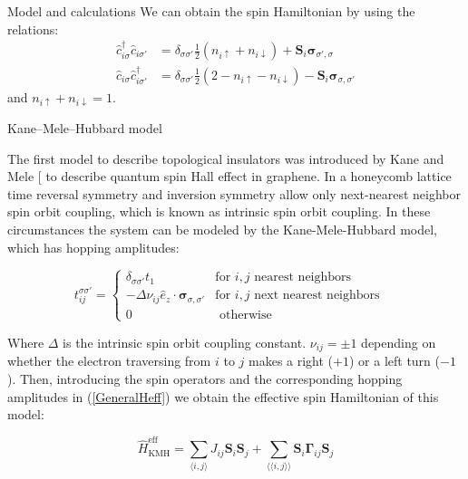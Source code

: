 \documentclass[aps,prl,twocolumn,amsmath,amssymb,superscriptaddress,nobibnotes]{revtex4}%
\renewcommand{\cite}[1]{{[}\onlinecite{#1}{]}}
\newcommand{\n}{\nonumber}
\newcommand{\bs}{\boldsymbol}
\begin{document}
\begin{section}{Model and calculations}
We can obtain the spin Hamiltonian by using the relations:
\begin{align}
\hat{c}_{i \sigma}^\dagger \hat{c}_{i \sigma'} &= \delta_{\sigma \sigma'} \frac{1}{2} (n_{i \uparrow} + n_{i \downarrow}) + \boldsymbol{S}_i\boldsymbol{\sigma}_{\sigma', \sigma} \label{SpinOperatorInv1}\\ 
\hat{c}_{i \sigma} \hat{c}_{i \sigma'}^\dagger &= \delta_{\sigma \sigma'} \frac{1}{2} (2 - n_{i \uparrow} - n_{i \downarrow}) - \boldsymbol{S}_i\boldsymbol{\sigma}_{\sigma, \sigma'} \label{SpinOperatorInv2}
\end{align}
and $n_{i \uparrow} + n_{i \downarrow} = 1$.

\begin{subsection}{Kane--Mele--Hubbard model}

The first model to describe topological insulators was introduced by Kane and Mele \cite{Kane2005} to describe quantum spin Hall effect in graphene. In a honeycomb lattice time reversal symmetry and inversion symmetry allow only next-nearest neighbor spin orbit coupling, which is known as intrinsic spin orbit coupling. In these circumstances the system can be modeled by the Kane-Mele-Hubbard model, which has hopping amplitudes:

\begin{equation}
t_{ij}^{\sigma \sigma'} = \begin{cases}
	\delta_{\sigma \sigma'}t_1 & \text{for } i, j \text{ nearest neighbors} \\
	-\Delta \nu_{ij} \hat{e}_z \cdot \bs{\sigma}_{\sigma, \sigma'} & \text{for } i, j \text{ next nearest neighbors} \\
	0 & \text{ otherwise} \n
\end{cases} \quad
\end{equation}

Where $\Delta$ is the intrinsic spin orbit coupling constant. $\nu_{ij}=\pm 1$ depending on whether the electron traversing from $i$ to $j$ makes a right ($+1$) or a left turn ($-1$). Then, introducing the spin operators and the corresponding hopping amplitudes in (\ref{GeneralHeff}) we obtain the effective spin Hamiltonian of this model:

\begin{equation}
\label{KMHeff}
\hat{H}_{\text{KMH}}^{\text{eff}} = \sum_{\langle i,j \rangle} J_{ij} \bs{S}_i \bs{S}_j + \sum_{\langle \langle i,j \rangle \rangle} \bs{S}_i \bs{\Gamma}_{ij} \bs{S}_j 
\end{equation}


\end{subsection}
\end{section}
\end{document}
